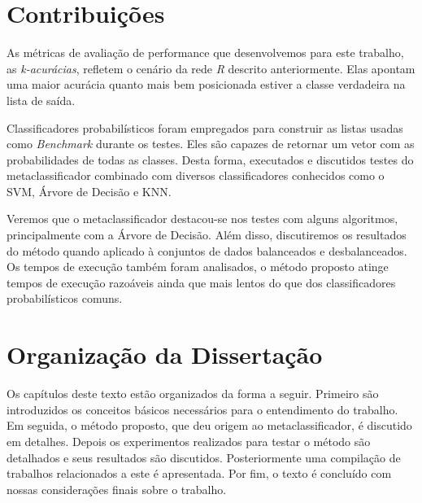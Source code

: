 \section{Contribuições}

As métricas de avaliação de performance que desenvolvemos para este trabalho, as \textit{k-acurácias}, refletem o cenário da rede \textit{R} descrito anteriormente.
Elas apontam uma maior acurácia quanto mais bem posicionada estiver a classe verdadeira na lista de saída.

Classificadores probabilísticos foram empregados para construir as listas usadas como \textit{Benchmark} durante os testes.
Eles são capazes de retornar um vetor com as probabilidades de todas as classes.
Desta forma, executados e discutidos testes do metaclassificador combinado com diversos classificadores conhecidos como o SVM, Árvore de Decisão e KNN.

Veremos que o metaclassificador destacou-se nos testes com alguns algoritmos, principalmente com a Árvore de Decisão.
Além disso, discutiremos os resultados do método quando aplicado à conjuntos de dados balanceados e desbalanceados.
Os tempos de execução também foram analisados, o método proposto atinge tempos de execução razoáveis ainda que mais lentos do que dos classificadores probabilísticos comuns.

\section{Organização da Dissertação}

Os capítulos deste texto estão organizados da forma a seguir.
Primeiro são introduzidos os conceitos básicos necessários para o entendimento do trabalho.
Em seguida, o método proposto, que deu origem ao metaclassificador, é discutido em detalhes.
Depois os experimentos realizados para testar o método são detalhados e seus resultados são discutidos.
Posteriormente uma compilação de trabalhos relacionados a este é apresentada.
Por fim, o texto é concluído com nossas considerações finais sobre o trabalho.